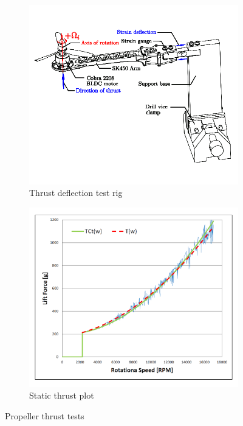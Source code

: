\begin{figure}[htbp]
\centering
\begin{subfigure}{0.49\textwidth}
\centering
\includegraphics[width=\textwidth]{figs/thrust-rig}
\vspace{-20pt}
\caption{Thrust deflection test rig}
\label{fig:thrust-rig}
\end{subfigure}
\begin{subfigure}{0.49\textwidth}
\centering
\includegraphics[width=\textwidth]{graphs/thrust-plot}
\vspace{-20pt}
\caption{Static thrust plot}
\label{fig:thrust-plot}
\end{subfigure}
\vspace{-8pt}
\caption{Propeller thrust tests}
\label{fig:thrusts}
\end{figure}
